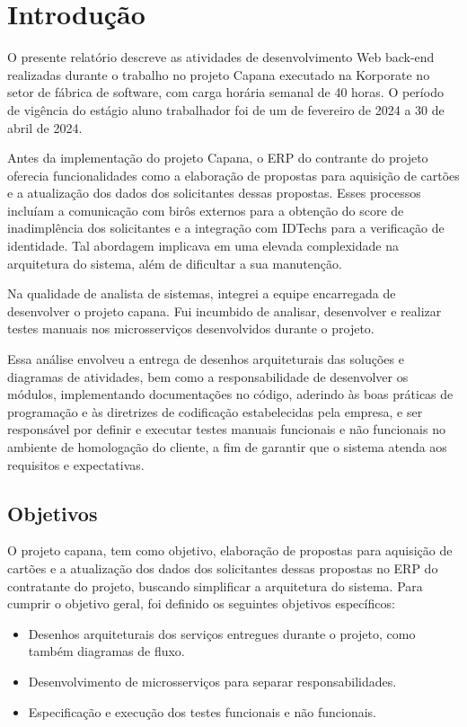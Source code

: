 \chapter{Introdução}
\label{Introdução}

O presente relatório descreve as atividades de desenvolvimento Web back-end 
realizadas durante o trabalho no projeto Capana executado na Korporate no setor de 
fábrica de software, com carga horária semanal de 40 horas. O período de vigência 
do estágio aluno trabalhador foi de um de fevereiro de 2024 a 30 de abril de 2024.

Antes da implementação do projeto Capana, o ERP do contrante do projeto oferecia 
funcionalidades como a elaboração de propostas para aquisição de cartões e a 
atualização dos dados dos solicitantes dessas propostas. Esses processos 
incluíam a comunicação com birôs externos para a obtenção do score de inadimplência 
dos solicitantes e a integração com IDTechs para a verificação de identidade. 
Tal abordagem implicava em uma elevada complexidade na arquitetura do sistema, 
além de dificultar a sua manutenção. 

Na qualidade de analista de sistemas, integrei a equipe encarregada de desenvolver 
o projeto capana. Fui incumbido de analisar, desenvolver e realizar testes 
manuais nos microsserviços desenvolvidos durante o projeto. 

Essa análise envolveu a entrega de desenhos arquiteturais das soluções e diagramas 
de atividades, bem como a responsabilidade de desenvolver os módulos, 
implementando documentações no código, aderindo às boas práticas de programação e 
às diretrizes de codificação estabelecidas pela empresa, e ser responsável por 
definir e executar testes manuais funcionais e não funcionais no ambiente de 
homologação do cliente, a fim de garantir que o sistema atenda aos requisitos e 
expectativas.				

\section{Objetivos}

O projeto capana, tem como objetivo, elaboração de propostas para aquisição de 
cartões e a atualização dos dados dos solicitantes dessas propostas no ERP do 
contratante do projeto, buscando simplificar a arquitetura do 
sistema. Para cumprir o objetivo geral, foi definido os seguintes objetivos 
específicos:

\begin{itemize}

    \item Desenhos arquiteturais dos serviços entregues durante o projeto, como 
    também diagramas de fluxo.
    \item Desenvolvimento de microsserviços para separar responsabilidades.
    \item Especificação e execução dos testes funcionais e não funcionais.

\end{itemize}

